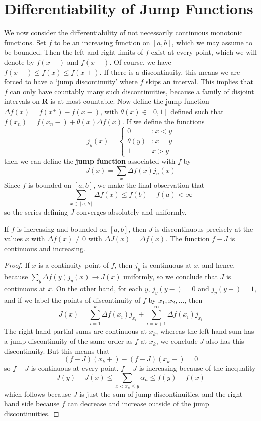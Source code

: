 \section{Differentiability of Jump Functions}

We now consider the differentiability of not necessarily continuous monotonic functions. Set $f$ to be an increasing function on $[a,b]$, which we may assume to be bounded.  Then the left and right limits of $f$ exist at every point, which we will denote by $f(x-)$ and $f(x+)$. Of course, we have $f(x-) \leq f(x) \leq f(x+)$. If there is a discontinuity, this means we are forced to have a `jump discontinuity' where $f$ skips an interval. This implies that $f$ can only have countably many such discontinuities, because a family of disjoint intervals on $\mathbf{R}$ is at most countable. Now define the jump function $\Delta f(x) = f(x^+) - f(x-)$, with $\theta(x) \in [0,1]$ defined such that $f(x_n) = f(x_n-) + \theta(x) \Delta f(x)$. If we define the functions
%
\[ j_y(x) = \begin{cases} 0 & : x < y \\ \theta(y) & : x = y \\ 1 & x > y \end{cases} \]
%
then we can define the {\bf jump function} associated with $f$ by
%
\[ J(x) = \sum_x \Delta f(x) j_n(x) \]
%
Since $f$ is bounded on $[a,b]$, we make the final observation that
%
\[ \sum_{x \in [a,b]} \Delta f(x) \leq f(b) - f(a) < \infty \]
%
so the series defining $J$ converges absolutely and uniformly.

\begin{lemma}
    If $f$ is increasing and bounded on $[a,b]$, then $J$ is discontinuous precisely at the values $x$ with $\Delta f(x) \neq 0$ with $\Delta J(x) = \Delta f(x)$. The function $f - J$ is continuous and increasing.
\end{lemma}
\begin{proof}
    If $x$ is a continuity point of $f$, then $j_y$ is continuous at $x$, and hence, because $\sum_y \Delta f(y) j_y(x) \to J(x)$ uniformly, so we conclude that $J$ is continuous at $x$. On the other hand, for each $y$, $j_y(y-) = 0$ and $j_y(y+) = 1$, and if we label the points of discontinuity of $f$ by $x_1, x_2, \dots$, then
    \[ J(x) = \sum_{i = 1}^k \Delta f(x_i) j_{x_i} + \sum_{i = k+1}^\infty \Delta f(x_i) j_{x_i} \]
    The right hand partial sums are continuous at $x_k$, whereas the left hand sum has a jump discontinuity of the same order as $f$ at $x_k$, we conclude $J$ also has this discontinuity. But this means that
    \[ (f - J)(x_k+) - (f - J)(x_k-) = 0 \]
    so $f - J$ is continuous at every point. $f - J$ is increasing because of the inequality
    \[ J(y) - J(x) \leq \sum_{x < x_n \leq y} \alpha_n \leq f(y) - f(x) \]
    which follows because $J$ is just the sum of jump discontinuities, and the right hand side because $f$ can decrease and increase outside of the jump discontinuities.
\end{proof}

